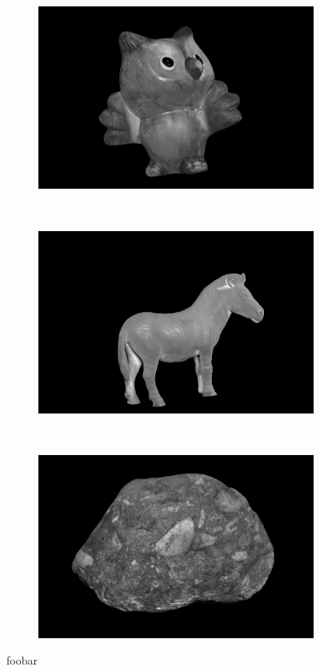 \documentclass{paper}
\begin{document}
\begin{figure}[h!]
     \begin{subfigure}{0.3\textwidth}
        \includegraphics[width=\textwidth]{results/owl/owl_a_lu}
    \end{subfigure}
    ~
    \begin{subfigure}{0.3\textwidth}
        \includegraphics[width=\textwidth]{results/horse/horse_a_lu}
    \end{subfigure}
    ~
    \begin{subfigure}{0.3\textwidth}
        \includegraphics[width=\textwidth]{results/rock/rock_a_lu}
    \end{subfigure}
    \caption{foobar}
    \label{fig:albeldo_lum}       
\end{figure}
\end{document}
